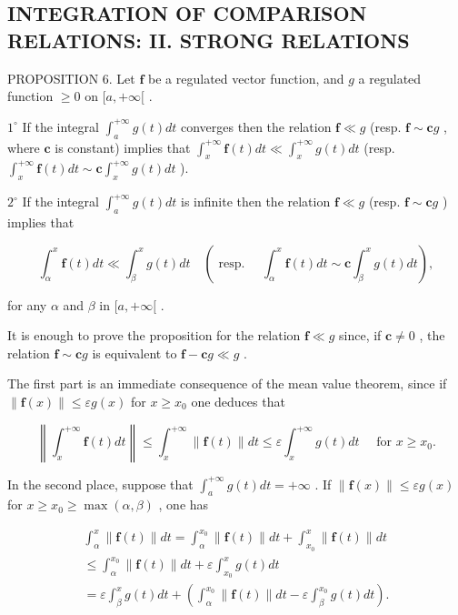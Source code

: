 \subsection{INTEGRATION OF COMPARISON RELATIONS: II. STRONG RELATIONS}

PROPOSITION 6. Let \(\mathbf{f}\) be a regulated vector function, and \(g\) a regulated function \(\geqslant 0\) on \([a, +\infty[\) .

\(1^{\circ}\) If the integral \(\int_{a}^{+\infty} g(t) dt\) converges then the relation \(\mathbf{f} \ll g\) (resp. \(\mathbf{f} \sim \mathbf{c}g\) , where \(\mathbf{c}\) is constant) implies that \(\int_{x}^{+\infty} \mathbf{f}(t) dt \ll \int_{x}^{+\infty} g(t) dt\) (resp. \(\int_{x}^{+\infty} \mathbf{f}(t) dt \sim \mathbf{c} \int_{x}^{+\infty} g(t) dt\) ).

\(2^{\circ}\) If the integral \(\int_{a}^{+\infty} g(t) dt\) is infinite then the relation \(\mathbf{f} \ll g\) (resp. \(\mathbf{f} \sim \mathbf{c}g\) ) implies that

\[
\int_ {\alpha} ^ {x} \mathbf {f} (t) d t \ll \int_ {\beta} ^ {x} g (t) d t \quad (\text { resp. } \quad \int_ {\alpha} ^ {x} \mathbf {f} (t) d t \sim \mathbf {c} \int_ {\beta} ^ {x} g (t) d t),
\]

for any \(\alpha\) and \(\beta\) in \([a, +\infty[\) .

It is enough to prove the proposition for the relation \(\mathbf{f} \ll g\) since, if \(\mathbf{c} \neq 0\) , the relation \(\mathbf{f} \sim \mathbf{c}g\) is equivalent to \(\mathbf{f} - \mathbf{c}g \ll g\) .

The first part is an immediate consequence of the mean value theorem, since if \(\|\mathbf{f}(x)\| \leqslant \varepsilon g(x)\) for \(x \geqslant x_{0}\) one deduces that

\[
\left\| \int_ {x} ^ {+ \infty} \mathbf {f} (t) d t \right\| \leqslant \int_ {x} ^ {+ \infty} \| \mathbf {f} (t) \| d t \leqslant \varepsilon \int_ {x} ^ {+ \infty} g (t) d t \quad \text { for } x \geqslant x _ {0}.
\]

In the second place, suppose that \(\int_{a}^{+\infty} g(t) dt = +\infty\) . If \(\| \mathbf{f}(x) \| \leqslant \varepsilon g(x)\) for \(x \geqslant x_0 \geqslant \max(\alpha, \beta)\) , one has

\[
\begin{array}{l} \int_ {\alpha} ^ {x} \| \mathbf {f} (t) \| d t = \int_ {\alpha} ^ {x _ {0}} \| \mathbf {f} (t) \| d t + \int_ {x _ {0}} ^ {x} \| \mathbf {f} (t) \| d t \\ \leqslant \int_ {\alpha} ^ {x _ {0}} \| \mathbf {f} (t) \| d t + \varepsilon \int_ {x _ {0}} ^ {x} g (t) d t \\ = \varepsilon \int_ {\beta} ^ {x} g (t) d t + \left(\int_ {\alpha} ^ {x _ {0}} \| \mathbf {f} (t) \| d t - \varepsilon \int_ {\beta} ^ {x _ {0}} g (t) d t\right). \end{array}
\]

